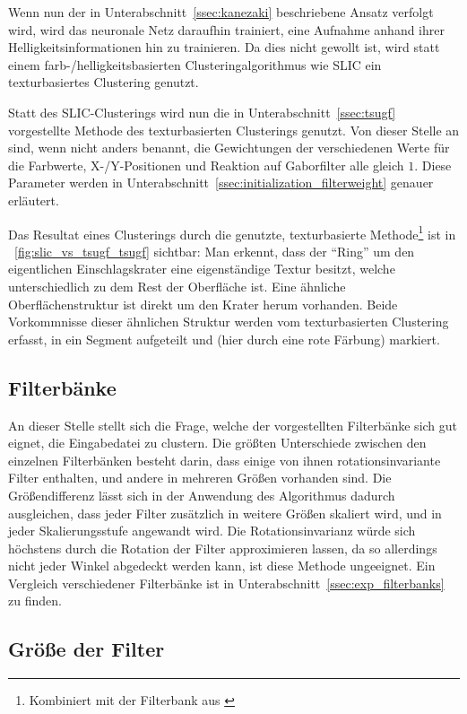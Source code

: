 Wenn nun der in Unterabschnitt~\ref{ssec:kanezaki} beschriebene Ansatz verfolgt wird, wird das neuronale Netz daraufhin trainiert, eine Aufnahme anhand ihrer Helligkeitsinformationen hin zu trainieren. Da dies nicht gewollt ist, wird statt einem farb-/helligkeitsbasierten Clusteringalgorithmus wie SLIC ein texturbasiertes Clustering genutzt.

Statt des SLIC-Clusterings wird nun die in Unterabschnitt~\ref{ssec:tsugf} vorgestellte Methode des texturbasierten Clusterings genutzt. Von dieser Stelle an sind, wenn nicht anders benannt, die Gewichtungen der verschiedenen Werte für die Farbwerte, X-/Y-Positionen und Reaktion auf Gaborfilter alle gleich $1$. Diese Parameter werden in Unterabschnitt~\ref{ssec:initialization_filterweight} genauer erläutert.

Das Resultat eines Clusterings durch die genutzte, texturbasierte Methode\footnote{Kombiniert mit der Filterbank aus \cite{jain_91}} ist in \figurename~\ref{fig:slic_vs_tsugf_tsugf} sichtbar: Man erkennt, dass der \enquote{Ring} um den eigentlichen Einschlagskrater eine eigenständige Textur besitzt, welche unterschiedlich zu dem Rest der Oberfläche ist. Eine ähnliche Oberflächenstruktur ist direkt um den Krater herum vorhanden. Beide Vorkommnisse dieser ähnlichen Struktur werden vom texturbasierten Clustering erfasst, in ein Segment aufgeteilt und (hier durch eine rote Färbung) markiert.


\subsection{Filterbänke}
\label{ssec:initialization_filterbanks}
An dieser Stelle stellt sich die Frage, welche der vorgestellten Filterbänke sich gut eignet, die Eingabedatei zu clustern. Die größten Unterschiede zwischen den einzelnen Filterbänken besteht darin, dass einige von ihnen rotationsinvariante Filter enthalten, und andere in mehreren Größen vorhanden sind. Die Größendifferenz lässt sich in der Anwendung des Algorithmus dadurch ausgleichen, dass jeder Filter zusätzlich in weitere Größen skaliert wird, und in jeder Skalierungsstufe angewandt wird. Die Rotationsinvarianz würde sich höchstens durch die Rotation der Filter approximieren lassen, da so allerdings nicht jeder Winkel abgedeckt werden kann, ist diese Methode ungeeignet. Ein Vergleich verschiedener Filterbänke ist in Unterabschnitt~\ref{ssec:exp_filterbanks} zu finden.

\subsection{Größe der Filter}
\label{ssec:initialization_filtersize}

